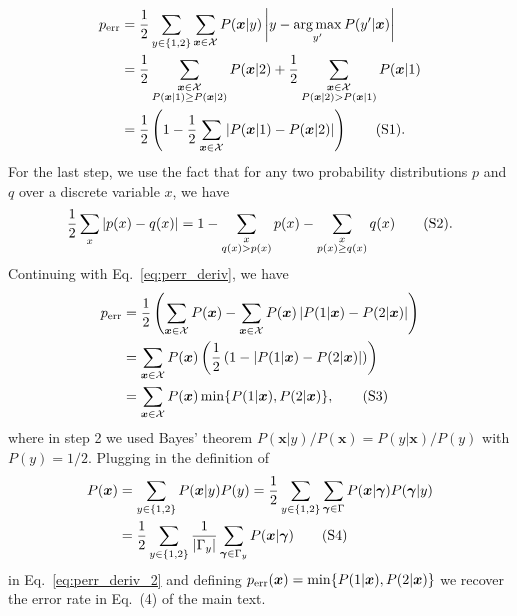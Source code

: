 \documentclass[twocolumn,aps,pra,superscriptaddress,tightlines,nofootinbib]{revtex4-2}
\DeclareMathOperator*{\argmax}{arg\,max}
\newcommand\numberthis{\addtocounter{equation}{1}\tag{\theequation}}
\begin{document}
	\begin{align*}\label{eq:perr_deriv}
		p_{\rm err} &= \frac{1}{2} \sum_{y \in \{1,2\}} \sum_{\bm{x}\in \mathcal{X}} P(\bm{x}|y)\left|y- \argmax_{y'} P(y'|\bm{x})\right|\\
		&= \frac{1}{2} \sum_{\substack{\bm{x}\in \mathcal{X}\\
				P(\bm{x}|1) \geq P(\bm{x}|2)}} P(\bm{x}|2) + \frac{1}{2} \sum_{\substack{\bm{x}\in \mathcal{X}\\
				P(\bm{x}|2) > P(\bm{x}|1)}} P(\bm{x}|1)\\
		&= \frac{1}{2} \left( 1- \frac{1}{2}\sum_{\bm{x}\in \mathcal{X}} \left|P(\bm{x}|1) - P(\bm{x}|2)\right|\right)\numberthis.
	\end{align*}
	For the last step, we use the fact that for any two probability distributions $p$ and $q$ over a discrete variable $x$, we have
	\begin{equation}
		\frac{1}{2}\sum_{x} \left|p(x)-q(x)\right| = 1-\sum_{\substack{x\\ q(x) > p(x)}} p(x) -\sum_{\substack{x\\ p(x) \geq q(x)}} q(x)\numberthis.
	\end{equation}
	Continuing with Eq.~\eqref{eq:perr_deriv}, we have
	\begin{align*}\label{eq:perr_deriv_2}
		p_{\rm err} &= \frac{1}{2} \left( \sum_{\bm{x}\in \mathcal{X}} P(\bm{x}) - \sum_{\bm{x}\in \mathcal{X}}P(\bm{x}) \left|P(1|\bm{x}) - P(2|\bm{x})\right|\right)\\
		&= \sum_{\bm{x}\in \mathcal{X}} P(\bm{x})\left( \frac{1}{2}\left( 1-  \left|P(1|\bm{x}) - P(2|\bm{x})\right| \right)\right)\\
		&= \sum_{\bm{x}\in \mathcal{X}}P(\bm{x}) \min\{P(1|\bm{x}), P(2|\bm{x})\},\numberthis
	\end{align*}
	where in step 2 we used Bayes' theorem $P(\bm{x}|y)/P(\bm{x})=P(y|\bm{x})/P(y)$ with $P(y)=1/2$. Plugging in the definition of
	\begin{align*}
		P(\bm{x}) &= \sum_{y \in \{ 1,2\}}P(\bm{x}|y)P(y) = \frac{1}{2}\sum_{y \in \{ 1,2\}} \sum_{\bm{\gamma} \in \Gamma }P(\bm{x}|\bm{\gamma})P(\bm{\gamma}|y)\\
		&= \frac{1}{2} \sum_{y \in \{ 1,2\}}\frac{1}{|\Gamma_{y}|} \sum_{\bm{\gamma} \in \Gamma_{y} }P(\bm{x}|\bm{\gamma})\numberthis
	\end{align*}
	in Eq.~\eqref{eq:perr_deriv_2} and defining $p_{\rm err}(\bm{x}) = \min\{P(1|\bm{x}), P(2|\bm{x})\}$ we recover the error rate in Eq.~(4) of the main text.\\
	
\end{document}
